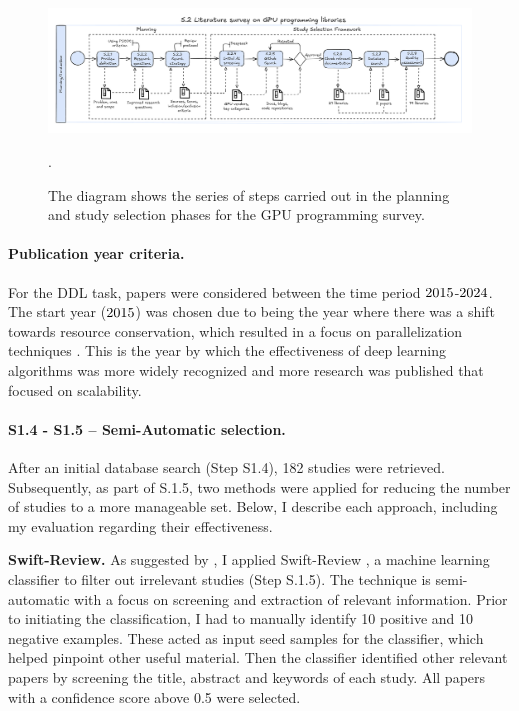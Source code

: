 \begin{figure}[th]
	\centering
	\includegraphics[width=\linewidth]{figures/survey-cuda3.pdf}
	\caption{The diagram shows the series of steps carried out in the planning and study selection
		phases for the GPU programming survey.}.
	\label{fig:workflow-study-cuda}
\end{figure}

\paragraph{Publication year criteria.}
For the DDL task, papers were considered between the time period $2015$-$2024$. The
start year ($2015$) was chosen due to being the year where there was a shift towards
resource conservation, which resulted in a focus on parallelization techniques
\cite{ben-nun_demystifying_2020}. This is the year by which the effectiveness of deep learning
algorithms was more widely recognized and more research was published that focused on scalability.

\paragraph{S1.4 - S1.5 -- Semi-Automatic selection.}
After an initial database search (Step S1.4), 182 studies were retrieved. Subsequently, as part of
S.1.5, two methods were applied for reducing the number of studies to a more manageable set. Below,
I describe each approach, including my evaluation regarding their effectiveness.

\textbf{Swift-Review.}
As suggested by \cite{bolanos_artificial_2024},
I applied Swift-Review \cite{Howard2016SWIFTReviewAT}, a machine learning classifier to filter out
irrelevant studies (Step S.1.5). The technique is semi-automatic
with a focus on screening and extraction of relevant information. Prior to initiating the classification,
I had to manually identify 10 positive and 10 negative examples. These
acted as input seed samples for the classifier, which helped pinpoint other useful material. Then
the classifier identified other relevant papers by screening the title, abstract and keywords of
each study. All papers with a confidence score above 0.5 were selected.


